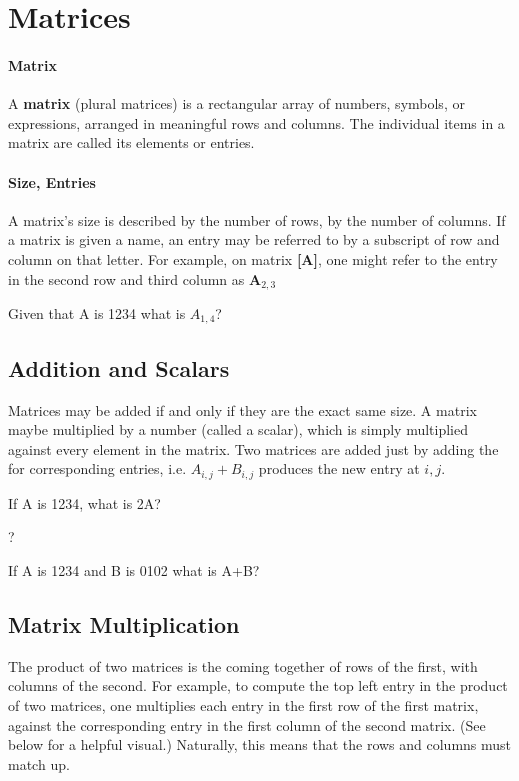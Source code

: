 
\section{Matrices}   

\paragraph{Matrix}
A \textbf{matrix} (plural matrices) is a rectangular array of numbers, symbols, or expressions, arranged in meaningful rows and columns.  The individual items in a matrix are called its elements or entries.


\paragraph{Size, Entries}
A matrix's size is described by the number of rows, by the number of columns.  If a matrix is given
a name, an entry may be referred to by a subscript of row and column on that letter.  For example,
on matrix \textbf{[A]}, one might refer to the entry in the second row and third column as
\textbf{A}$_{2,3}$

\begin{example}
\exProblem
Given that A is 1234 what is $A_{1,4}$?

\end{example}

\subsection{Addition and Scalars}
Matrices may be added if and only if they are the exact same size.  A matrix maybe multiplied by
a number (called a \gls{scalar}), which is simply multiplied against every element in the matrix.
Two matrices are added just by adding the for corresponding entries, i.e. $A_{i,j}+B_{i,j}$ 
produces the new entry at $i,j$.

\begin{example}
\exProblem
If A is 1234, what is 2A?

?
\end{example}

\begin{example}
\exProblem
If A is 1234 and B is 0102 what is A+B?

\end{example}

\subsection{Matrix Multiplication}
The product of two matrices is the coming together of rows of the first, with columns of the second.  For example,
to compute the top left entry in the product of two matrices, one multiplies each entry in the first row of the first matrix,
against the corresponding entry in the first column of the second matrix.  (See below for a helpful visual.)  Naturally,
this means that the rows and columns must match up.




